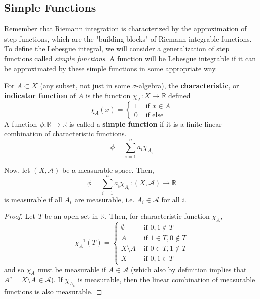 \documentclass{article}
\begin{document}
\subsection{Simple Functions}

Remember that Riemann integration is characterized by the approximation of step functions, which are the "building blocks" of Riemann integrable functions. To define the Lebesgue integral, we will consider a generalization of step functions called \textit{simple functions}. A function will be Lebesgue integrable if it can be approximated by these simple functions in some appropriate way. 

\begin{definition}
  For $A \subset X$ (any subset, not just in some $\sigma$-algebra), the \textbf{characteristic}, or \textbf{indicator} \textbf{function} of $A$ is the function $\chi_A : X \longrightarrow \mathbb{R}$ defined 
  \[\chi_A (x) = \begin{cases} 1 & \text{ if } x \in A \\ 0 & \text{ if else} \end{cases}\]
  A function $\phi: \mathbb{R} \longrightarrow \mathbb{R}$ is called a \textbf{simple function} if it is a finite linear combination of characteristic functions. 
  \[\phi = \sum_{i=1}^n a_i \chi_{A_i}\]
\end{definition}

\begin{lemma}
  Now, let $(X, \mathcal{A})$ be a measurable space. Then, 
  \[\phi = \sum_{i=1}^n a_i \chi_{A_i} : (X, \mathcal{A}) \longrightarrow \mathbb{R}\]
  is measurable if all $A_i$ are measurable, i.e. $A_i \in \mathcal{A}$ for all $i$. 
\end{lemma}
\begin{proof}
  Let $T$ be an open set in $\mathbb{R}$. Then, for characteristic function $\chi_A$, 
  \[\chi_A^{-1} (T) = \begin{cases} 
  \emptyset & \text{ if } 0, 1 \not\in T \\
  A & \text{ if } 1 \in T, 0 \not\in T \\
  X \setminus A & \text{ if } 0 \in T, 1 \not\in T \\
  X & \text{ if } 0, 1 \in T
  \end{cases}\]
  and so $\chi_A$ must be measurable if $A \in \mathcal{A}$ (which also by definition implies that $A^c = X \setminus A \in \mathcal{A}$). If $\chi_{A_i}$ is measurable, then the linear combination of measurable functions is also measurable. 
\end{proof}
\end{document}

